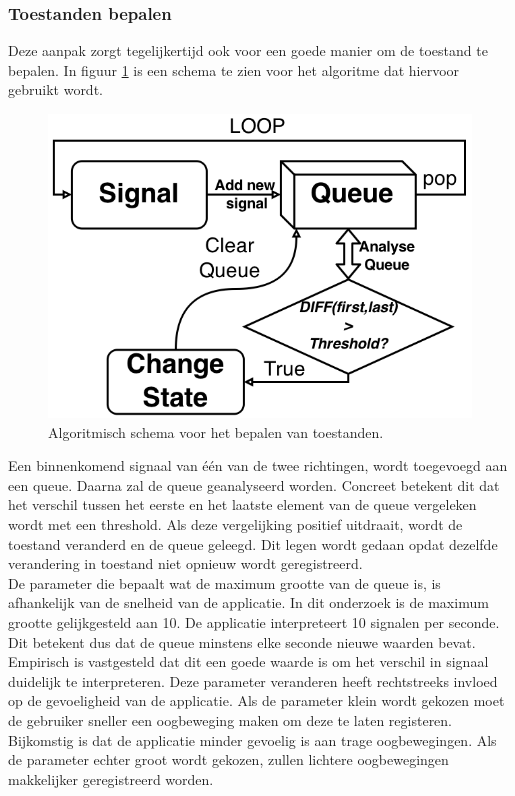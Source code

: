 \documentclass{article}
\newcommand{\figwidth}{0.82\linewidth}
\begin{document}
\subsubsection*{Toestanden bepalen}
Deze aanpak zorgt tegelijkertijd ook voor een goede manier om de toestand te bepalen. In figuur \ref{fig:algostatefilter} is een schema te zien voor het algoritme dat hiervoor gebruikt wordt.
\begin{figure}[H]
	\centering
	\includegraphics[width=\figwidth]{images/StateFilter_bw}
	\caption{Algoritmisch schema voor het bepalen van toestanden.}
	\label{fig:algostatefilter}
\end{figure}
Een binnenkomend signaal van \'e\'en van de twee richtingen, wordt toegevoegd aan een queue. Daarna zal de queue geanalyseerd worden. Concreet betekent dit dat het verschil tussen het eerste en het laatste element van de queue vergeleken wordt met een threshold. Als deze vergelijking positief uitdraait, wordt de toestand veranderd en de queue geleegd. Dit legen wordt gedaan opdat dezelfde verandering in toestand niet opnieuw wordt geregistreerd.\\
De parameter die bepaalt wat de maximum grootte van de queue is, is afhankelijk van de snelheid van de applicatie. In dit onderzoek is de maximum grootte gelijkgesteld aan 10. De applicatie interpreteert 10 signalen per seconde. Dit betekent dus dat de queue minstens elke seconde nieuwe waarden bevat. Empirisch is vastgesteld dat dit een goede waarde is om het verschil in signaal duidelijk te interpreteren. Deze parameter veranderen heeft rechtstreeks invloed op de gevoeligheid van de applicatie. Als de parameter klein wordt gekozen moet de gebruiker sneller een oogbeweging maken om deze te laten registeren. Bijkomstig is dat de applicatie minder gevoelig is aan trage oogbewegingen. Als de parameter echter groot wordt gekozen, zullen lichtere oogbewegingen makkelijker geregistreerd worden.\\
\end{document}
